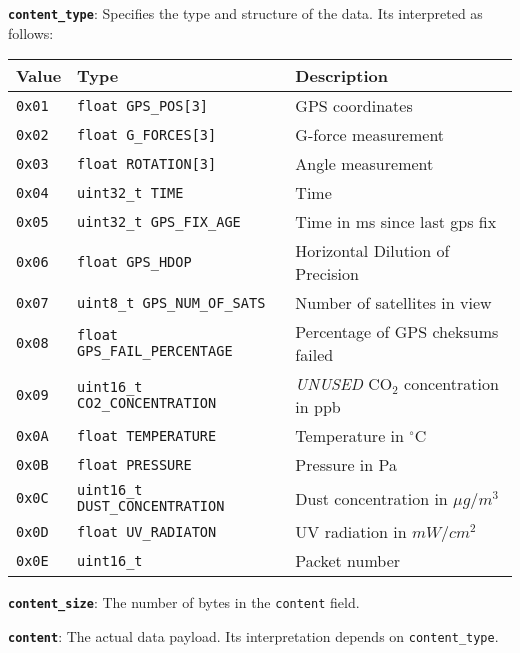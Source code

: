 \documentclass[a4paper]{article}
\begin{document}
\textbf{\texttt{content\_type}}: Specifies the type and structure of the data. Its interpreted as follows:
\begin{longtable}{@{}lll@{}}
  \toprule
  Value         & Type                & Description                      \\
  \midrule
  \texttt{0x01} & \texttt{float GPS\_POS[3]}            & GPS coordinates                          \\
  \texttt{0x02} & \texttt{float G\_FORCES[3]}           & G-force measurement                      \\
  \texttt{0x03} & \texttt{float ROTATION[3]}            & Angle measurement                        \\
  \texttt{0x04} & \texttt{uint32\_t TIME}               & Time                                     \\
  \texttt{0x05} & \texttt{uint32\_t GPS\_FIX\_AGE}      & Time in ms since last gps fix            \\
  \texttt{0x06} & \texttt{float GPS\_HDOP}              & Horizontal Dilution of Precision         \\
  \texttt{0x07} & \texttt{uint8\_t GPS\_NUM\_OF\_SATS}  & Number of satellites in view             \\
  \texttt{0x08} & \texttt{float GPS\_FAIL\_PERCENTAGE}  & Percentage of GPS cheksums failed        \\
  \texttt{0x09} & \texttt{uint16\_t CO2\_CONCENTRATION} & \emph{UNUSED} CO$_2$ concentration in ppb\\
  \texttt{0x0A} & \texttt{float TEMPERATURE}            & Temperature in $^\circ$C                 \\
  \texttt{0x0B} & \texttt{float PRESSURE}               & Pressure in Pa                           \\
  \texttt{0x0C} & \texttt{uint16\_t DUST\_CONCENTRATION}& Dust concentration in $\mu g/m^3$        \\
  \texttt{0x0D} & \texttt{float UV\_RADIATON}           & UV radiation in $mW/cm^2$                \\
  \texttt{0x0E} & \texttt{uint16\_t}                    & Packet number                            \\
  \bottomrule
\end{longtable}

\textbf{\texttt{content\_size}}: The number of bytes in the \texttt{content} field.

\textbf{\texttt{content}}: The actual data payload. Its interpretation depends on \texttt{content\_type}.
\end{document}
